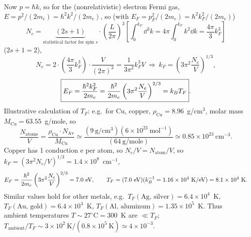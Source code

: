 Now $p = \hbar k$, so for the (nonrelativistic) electron Fermi gas, $E = p^2/(2m_e) = \hbar^2k^2/(2m_e)$, so (with
$E_F = p_F^2/(2m_e) = \hbar^2k_F^2/(2m_e)$)
\begin{equation}
  N_e = \underbrace{(2s+1)}_{\text{statistical factor for spin }s}\cdot\left(\frac{L}{2\pi}\right)^3\left[\int_0^{k_F}\dd^3k = 4\pi\int_0^{k_F}k^2\dd k = \frac{4\pi}{3}k_F^3\right]
\end{equation}
($2s+1 = 2$),
\begin{equation}
  N_e = 2\cdot\left(\frac{4\pi}{3}k_F^3\right)\cdot\frac{V}{(2\pi)^3} = \frac{1}{3\pi^2}k_F^3V
  \ \Rightarrow\ k_F = \left(3\pi^2\frac{N_e}{V}\right)^{1/3},
\end{equation}
\begin{equation}
  \boxed{E_F = \frac{\hbar^2k_F^2}{2m_e} = \frac{\hbar^2}{2m_e}\left(3\pi^2\frac{N_e}{V}\right)^{2/3} = k_{B} T_F}.
\end{equation}
Illustrative calculation of $T_F$: e.g.\ for Cu, copper, $\rho_{\text{Cu}} = 8.96$~g/cm$^3$, molar mass $M_{\text{Cu}} = 63.55$~g/mole, so
\begin{equation}
  \frac{N_{\text{atoms}}}{V} = \frac{\rho_{\text{Cu}}\cdot N_{\text{Av}}}{M_{\text{Cu}}}\simeq\frac{\left(9\ \text{g}/\text{cm}^3\right)(6\times 10^{23}\ \text{mol}^{-1})}{(64\ \text{g/mole})}
  \simeq 0.85\times 10^{23}\ \text{cm}^{-3}.
\end{equation}
Copper has 1 conduction e per atom, so $N_e/V = N_{\text{atom}}/V$, so
$k_F = \left(3\pi^2N_e/V\right)^{1/3} = 1.4\times 10^8$~cm$^{-1}$,
\begin{equation}
  E_F = \frac{\hbar^2}{2m_e}\left(3\pi^2\frac{N_e}{V}\right)^{2/3} = 7.0\ \text{eV},\qquad
  T_F = (7.0\ \text{eV})(\kB^{-1} = 1.16\times 10^4\ \text{K/eV}) = 8.1\times 10^4\ \text{K}.
\end{equation}
Similar values hold for other metals, e.g.\ $T_F(\text{Ag, silver}) = 6.4\times 10^4$~K, $T_F(\text{Au, gold}) = 6.4\times 10^4$~K,
$T_F(\text{Al, aluminum}) = 1.35\times 10^5$~K. Thus ambient temperatures $T\sim 27^\circ\text{C} = 300$~K are $\ll T_F$;
$T_{\text{ambient}}/T_F\sim3\times 10^2\ \text{K}/(0.8\times 10^5\ \text{K})\simeq 4\times 10^{-3}$.

\begin{diagram}
\end{diagram}

